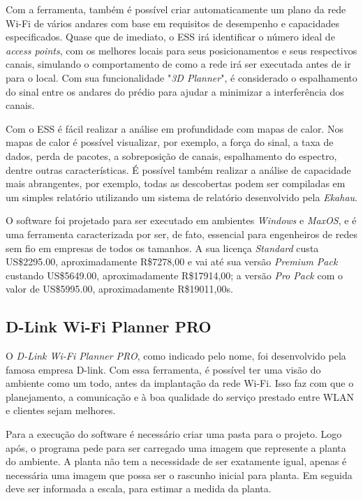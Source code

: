 \documentclass[
	12pt,				%
	openright,			%
	twoside,			%
	a4paper,			%
	english,			%
	french,				%
	spanish,			%
	brazil				%
	]{abntex2}
\begin{document}
Com a ferramenta, também é possível criar automaticamente um plano da rede Wi-Fi de vários andares com base em requisitos de desempenho e capacidades especificados. Quase que de imediato, o ESS irá identificar o número ideal de \textit{access points}, com os melhores locais para seus posicionamentos e seus respectivos canais, simulando o comportamento de como a rede irá ser executada antes de ir para o local. Com sua funcionalidade "\textit{3D Planner}", é considerado o espalhamento do sinal entre os andares do prédio para ajudar a minimizar a interferência dos canais.

Com o ESS é fácil realizar a análise em profundidade com mapas de calor. Nos mapas de calor é possível visualizar, por exemplo, a força do sinal, a taxa de dados, perda de pacotes, a sobreposição de canais, espalhamento do espectro, dentre outras características. É possível também realizar a análise de capacidade mais abrangentes, por exemplo, todas as descobertas podem ser compiladas em um simples relatório utilizando um sistema de relatório desenvolvido pela \textit{Ekahau}. 

O software foi projetado para ser executado em ambientes \textit{Windows} e \textit{MaxOS}, e é uma ferramenta caracterizada por ser, de fato, essencial para engenheiros de redes sem fio em empresas de todos os tamanhos. A sua licença \textit{Standard} custa US\$2295.00, aproximadamente R\$7278,00 e vai até sua versão \textit{Premium Pack} custando US\$5649.00, aproximadamente R\$17914,00; a versão \textit{Pro Pack} com o valor de US\$5995.00, aproximadamente R\$19011,00s.


\subsection[D-Link Wi-Fi Planner PRO]{D-Link Wi-Fi Planner PRO}

O \textit{D-Link Wi-Fi Planner PRO}, como indicado pelo nome, foi desenvolvido pela famosa empresa D-link. Com essa ferramenta, é possível ter uma visão do ambiente como um todo, antes da implantação da rede Wi-Fi. Isso faz com que o planejamento, a comunicação e à boa qualidade do serviço prestado entre WLAN e clientes sejam melhores.

Para a execução do software é necessário criar uma pasta para o projeto. Logo após, o programa pede para ser carregado uma imagem que represente a planta do ambiente. A planta não tem a necessidade de ser exatamente igual, apenas é necessária uma imagem que possa ser o rascunho inicial para planta. Em seguida deve ser informada a escala, para estimar a medida da planta.
\end{document}
